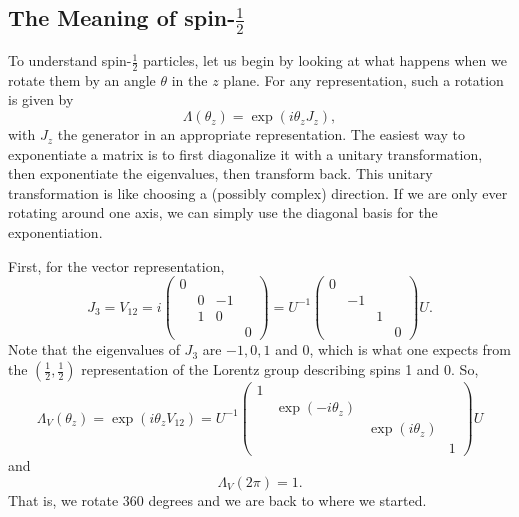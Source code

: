 \documentclass[11pt]{article}
\theoremstyle{definition}
\begin{document}
\subsection{The Meaning of spin-$\frac{1}{2}$}
To understand spin-\(\frac{1}{2}\) particles, let us begin by looking at what happens when we rotate them by an angle \(\theta\) in the \(z\) plane. For any representation, such a rotation is given by
\begin{equation}
\Lambda(\theta_{z}) = \exp(i\theta_{z}J_{z}),
\end{equation}
with \( J_z \) the generator in an appropriate representation. The easiest way to exponentiate a matrix is to first diagonalize it with a unitary transformation, then exponentiate the eigenvalues, then transform back. This unitary transformation is like choosing a (possibly complex) direction. If we are only ever rotating around one axis, we can simply use the diagonal basis for the exponentiation.

First, for the vector representation,
\begin{equation}
J_3 = V_{12} = i \begin{pmatrix}
0 &  & & \\
& 0 & -1 \\
& 1& 0 & \\
&&&0
\end{pmatrix} = U^{-1} \begin{pmatrix}
0 &  & & \\
& -1 &  \\
& & 1 & \\
&&&0
\end{pmatrix} U.
\end{equation}
Note that the eigenvalues of \( J_3 \) are \(-1, 0, 1\) and \( 0 \), which is what one expects from the \(\left( \frac{1}{2}, \frac{1}{2} \right)\) representation of the Lorentz group describing spins 1 and 0. So,
\begin{equation}
\Lambda_V (\theta_z) = \exp(i\theta_z V_{12}) = U^{-1} \begin{pmatrix}
1 & & & \\
& \exp(-i\theta_z) &&\\
& & \exp(i\theta_z) \\
& & & 1

\end{pmatrix} U
\end{equation}
and
\begin{equation}
\Lambda_V (2\pi) = 1.
\end{equation}
That is, we rotate 360 degrees and we are back to where we started.
\end{document}
